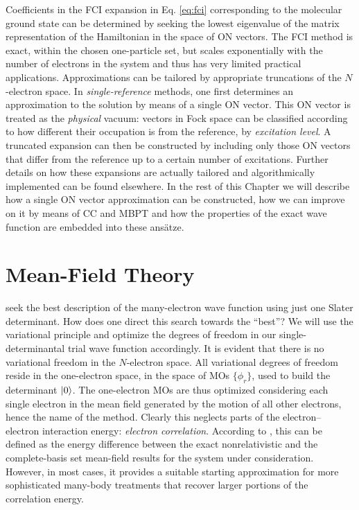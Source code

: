 Coefficients in the \acrshort{FCI} expansion in Eq. \eqref{eq:fci} corresponding to the molecular ground
state can be determined by seeking the lowest eigenvalue of the matrix
representation of the Hamiltonian in the space of \acrshort{ON} vectors.
The \acrshort{FCI} method is exact, within the chosen one-particle set,
but scales exponentially with the number of electrons in the system and
thus has very limited practical applications.
Approximations can be tailored by appropriate truncations of the
$N$-electron space.
In \emph{single-reference} methods, one first determines an
approximation to the solution by means of a single \acrshort{ON} vector.
This \acrshort{ON} vector is treated as the \emph{physical} vacuum:
vectors in Fock space can be classified according to how different their
occupation is from the reference, \ie by \emph{excitation
level}.\autocite{Helgaker2000-tz, Shavitt2009-mr}
A truncated expansion can then be constructed by including only those
\acrshort{ON} vectors that differ from the reference up to a certain
number of excitations.
Further details on how these expansions are actually tailored and
algorithmically implemented can be found elsewhere.\autocite{Helgaker2000-tz}
In the rest of this Chapter we will describe how a single \acrshort{ON}
vector approximation can be constructed, how we can improve on it by
means of \acrlong{CC} and \acrlong{MBPT} and how the properties of the
exact wave function are embedded into these ans\"{a}tze.

\section{Mean-Field Theory}\label{sec:mean-field}

   seek the best description
of the many-electron wave function using just one Slater determinant.
How does one direct this search towards the \enquote{best}? We will use the
variational principle and optimize the degrees of freedom in our
single-determinantal trial wave function accordingly.
It is evident that there is no variational freedom in the
$N$-electron space. All variational degrees of freedom reside in
the one-electron space, \ie in the space of \glspl{MO}
$\lbrace\phi_r\rbrace$, used to build the determinant $\Ket{0}$.
The one-electron \glspl{MO}
are thus optimized considering each single electron in the mean field generated
by the motion of all other electrons, hence the name of the
method. Clearly this neglects parts of the electron-- electron
interaction energy: \emph{electron correlation}.
According to \citeauthor{Lowdin1955-yt}, this can be defined as the
energy difference between the exact nonrelativistic and the
complete-basis set mean-field results for the system under
consideration.\autocite{Lowdin1955-yt}
However, in most cases, it provides a suitable starting
approximation for more sophisticated many-body treatments that recover
larger portions of the correlation energy.

